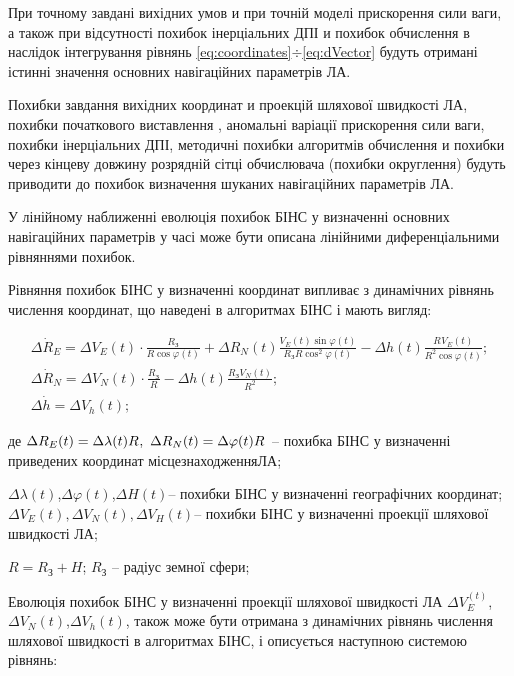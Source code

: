При точному завдані вихідних умов и при точній  моделі прискорення сили ваги, а також 
при відсутності похибок інерціальних ДПІ и похибок обчислення в наслідок інтегрування 
рівнянь \eqref{eq:coordinates}$\div $\eqref{eq:dVector}  будуть отримані істинні 
значення основних навігаційних параметрів ЛА.

Похибки завдання вихідних координат и проекцій шляхової швидкості ЛА, похибки  початкового 
виставлення , аномальні варіації прискорення сили ваги, похибки інерціальних ДПІ, 
методичні похибки алгоритмів обчислення и похибки через  кінцеву довжину розрядній 
сітці обчислювача (похибки округлення) будуть приводити до похибок визначення шуканих 
навігаційних параметрів ЛА.

У лінійному наближенні еволюція похибок БІНС у визначенні основних навігаційних параметрів 
у часі може бути описана лінійними диференціальними рівняннями похибок.

Рівняння похибок БІНС у визначенні координат випливає з динамічних рівнянь числення 
координат, що наведені в алгоритмах БІНС і мають вигляд:

\begin{equation} 
\label{eq:dRsdins} 
\begin{array}{l} 
{\Delta \dot{R}_{E} =\Delta V_{E}(t)\cdot \frac{R_{\text{З}} }{R\cos \varphi (t)} 
+\Delta R_{N} (t)\frac{V_{E}^{}(t)\sin \varphi (t)}{R_{\text{З}} R\cos ^{2} \varphi (t)} 
-\Delta h(t)\frac{R_{} V_{E}^{}(t)}{R^{2} \cos \varphi (t)} ;} \\ 
{\Delta \dot{R}_{N} =\Delta V_{N}(t)\cdot \frac{R_{\text{З}}}{R} -\Delta h(t)\frac{R_{\text{З}} V_{N}(t)}{R^{2}};} \\ 
{\Delta \dot{h} =\Delta V_{h} (t);} \end{array} \end{equation} 
\begin{ESKDexplanation}
\item де $\Delta R_{E} (t)=\Delta \lambda (t)R_{{\rm }} ,\, \, \Delta R_{N} (t)=\Delta\varphi (t)R_{{\rm }} $
-- похибка БІНС у визначенні приведених координат місцезнаходженняЛА; 
\item $\Delta \lambda (t)$,$\Delta \varphi (t)$,$\Delta H(t)$-- похибки БІНС у визначенні 
географічних координат; $\Delta V_{E} (t),\Delta V_{N} (t),\Delta V_{H} (t)$-- похибки 
БІНС у визначенні проекції шляхової швидкості ЛА; 
\item $R=R_{\text{З}} +H$; $R_{\text{З}}$  -- радіус земної сфери; 
\end{ESKDexplanation}
Еволюція похибок БІНС у визначенні проекції шляхової швидкості ЛА $\Delta V_{E}^(t)$,
$\Delta V_{N}(t)$,$\Delta V_{h}(t)$, також може бути отримана з динамічних 
рівнянь числення шляхової швидкості в алгоритмах БІНС, і описується наступною системою 
рівнянь: 

